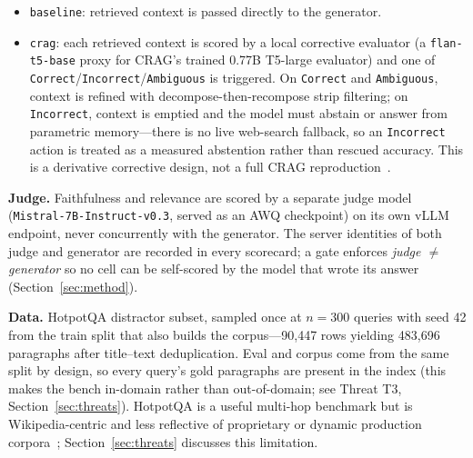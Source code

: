 \begin{itemize}
    \item \texttt{baseline}: retrieved context is passed directly to the
          generator.
    \item \texttt{crag}: each retrieved context is scored by a local
          corrective evaluator (a \texttt{flan-t5-base} proxy for CRAG's
          trained 0.77B T5-large evaluator) and one of
          \texttt{Correct}/\texttt{Incorrect}/\texttt{Ambiguous} is
          triggered. On \texttt{Correct} and \texttt{Ambiguous}, context
          is refined with decompose-then-recompose strip filtering; on
          \texttt{Incorrect}, context is emptied and the model must
          abstain or answer from parametric memory---there is no live
          web-search fallback, so an \texttt{Incorrect} action is treated
          as a measured abstention rather than rescued accuracy. This is
          a derivative corrective design, not a full CRAG
          reproduction~\cite{yan2024crag}.
\end{itemize}

\textbf{Judge.} Faithfulness and relevance are scored by a separate judge
model (\texttt{Mistral-7B-Instruct-v0.3}, served as an AWQ checkpoint) on
its own vLLM endpoint, never concurrently with the generator. The server
identities of both judge and generator are recorded in every scorecard; a
gate enforces \emph{judge $\neq$ generator} so no cell can be
self-scored by the model that wrote its answer (Section~\ref{sec:method}).

\textbf{Data.} HotpotQA distractor subset, sampled once at $n=300$
queries with seed 42 from the train split that also builds the
corpus---90,447 rows yielding 483,696 paragraphs after title--text
deduplication. Eval and corpus come from the same split by design, so
every query's gold paragraphs are present in the index (this makes the
bench in-domain rather than out-of-domain; see Threat T3,
Section~\ref{sec:threats}). HotpotQA is a useful multi-hop benchmark but
is Wikipedia-centric and less reflective of proprietary or dynamic
production corpora~\cite{wu2024survey,mala2026faithfulness}; Section~\ref{sec:threats}
discusses this limitation.

